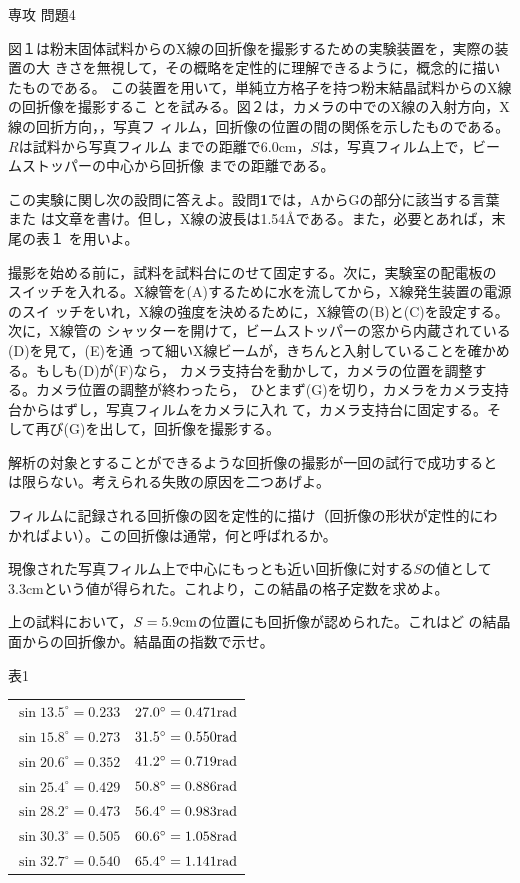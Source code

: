 \documentclass[fleqn]{jbook}
\begin{document}
\begin{question}{専攻 問題4}{}

図１は粉末固体試料からのX線の回折像を撮影するための実験装置を，実際の装置の大
きさを無視して，その概略を定性的に理解できるように，概念的に描いたものである。
この装置を用いて，単純立方格子を持つ粉末結晶試料からのX線の回折像を撮影するこ
とを試みる。図２は，カメラの中でのX線の入射方向，X線の回折方向，，写真フ
ィルム，回折像の位置の間の関係を示したものである。$R$は試料から写真フィルム
までの距離で6.0cm，$S$は，写真フィルム上で，ビームストッパーの中心から回折像
までの距離である。

この実験に関し次の設問に答えよ。設問{\bf 1}では，AからGの部分に該当する言葉また
は文章を書け。但し，X線の波長は1.54\AA である。また，必要とあれば，末尾の表１
を用いよ。

\begin{subquestions}
\SubQuestion
撮影を始める前に，試料を試料台にのせて固定する。次に，実験室の配電板の
スイッチを入れる。X線管を(A)するために水を流してから，X線発生装置の電源のスイ
ッチをいれ，X線の強度を決めるために，X線管の(B)と(C)を設定する。次に，X線管の
シャッターを開けて，ビームストッパーの窓から内蔵されている(D)を見て，(E)を通
って細いX線ビームが，きちんと入射していることを確かめる。もしも(D)が(F)なら，
カメラ支持台を動かして，カメラの位置を調整する。カメラ位置の調整が終わったら，
ひとまず(G)を切り，カメラをカメラ支持台からはずし，写真フィルムをカメラに入れ
て，カメラ支持台に固定する。そして再び(G)を出して，回折像を撮影する。

\SubQuestion
解析の対象とすることができるような回折像の撮影が一回の試行で成功すると
は限らない。考えられる失敗の原因を二つあげよ。

\SubQuestion
 フィルムに記録される回折像の図を定性的に描け（回折像の形状が定性的にわ
かればよい）。この回折像は通常，何と呼ばれるか。

\SubQuestion
現像された写真フィルム上で中心にもっとも近い回折像に対する$S$の値として
3.3cmという値が得られた。これより，この結晶の格子定数を求めよ。

\SubQuestion
上の試料において，$S=5.9{\rm cm}$の位置にも回折像が認められた。これはど
の結晶面からの回折像か。結晶面の指数で示せ。

\begin{center}
表1\\
\begin{tabular}{cc}
$\sin 13.5^{\circ}=0.233$ & $27.0^{\circ}=0.471 \rm rad $\\
$\sin 15.8^{\circ}=0.273$ & $31.5^{\circ}=0.550 \rm rad $\\
$\sin 20.6^{\circ}=0.352$ & $41.2^{\circ}=0.719 \rm rad $\\
$\sin 25.4^{\circ}=0.429$ & $50.8^{\circ}=0.886 \rm rad $\\
$\sin 28.2^{\circ}=0.473$ & $56.4^{\circ}=0.983 \rm rad $\\
$\sin 30.3^{\circ}=0.505$ & $60.6^{\circ}=1.058 \rm rad $\\
$\sin 32.7^{\circ}=0.540$ & $65.4^{\circ}=1.141 \rm rad $\\
\end{tabular}
\end{center}


\end{subquestions}
\end{question}
\end{document}

